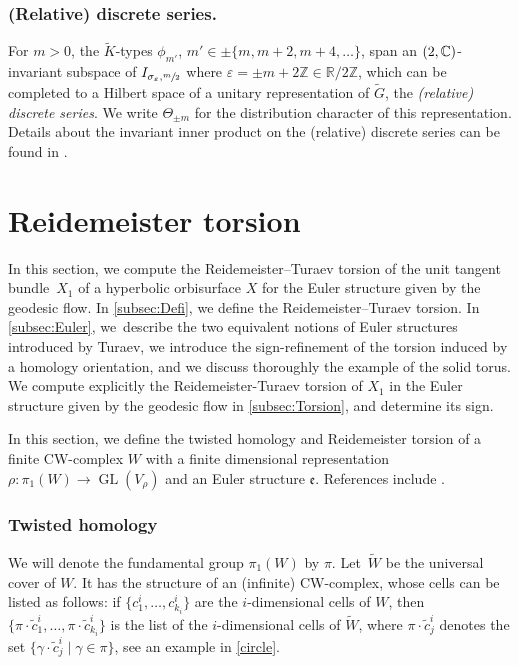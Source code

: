 \documentclass[JEP,XML,SOM,Unicode,NoFloatCountersInSection,published]{cedram}
\theoremstyle{plain}
\theoremstyle{definition}
\theoremstyle{remark}
\newcommand{\R}{\mathbb{R}}
\newcommand{\Z}{\mathbb{Z}}
\newcommand{\C}{\mathbb{C}}
\let\sl\relax
\DeclareMathOperator{\sl}{\mathfrak{sl}}
\DeclareMathOperator{\GL}{GL}
\numberwithin{equation}{section}
\begin{document}
\subsubsection*{(Relative) discrete series.} For $m>0$, the $\widetilde{K}$-types $\phi_{m'}$, $m'\in\pm\{m,m+2,m+4,\ldots\}$, span an $\sl(2,\C)$-invariant subspace of $I_{\sigma_\varepsilon,\sfrac{m}{2}}$ where $\varepsilon=\pm m+2\Z\in\R/2\Z$, which can be completed to a Hilbert space of a unitary representation of $\widetilde{G}$, the \emph{(relative) discrete series}. We write $\Theta_{\pm m}$ for the distribution character of this representation. Details about the invariant inner product on the (relative) discrete series can be found in \cite[\S 1]{Hof94}.

\section{Reidemeister torsion}
\label{sec:Reidemeister}
In this section, we compute the Reidemeister--Turaev torsion of the unit tangent bundle~$X_1$ of a hyperbolic orbisurface $X$ for the Euler structure given by the geodesic flow. In \cref{subsec:Defi}, we define the Reidemeister--Turaev torsion. In \cref{subsec:Euler}, we~describe the two equivalent notions of Euler structures introduced by Turaev, we introduce the sign-refinement of the torsion induced by a homology orientation, and we discuss thoroughly the example of the solid torus. We compute explicitly the Reidemeister-Turaev torsion of $X_1$ in the Euler structure given by the geodesic flow in \cref{subsec:Torsion}, and determine its sign.

\label{subsec:Defi}
In this section, we define the twisted homology and Reidemeister torsion of a finite CW-complex $W$ with a finite dimensional representation $\rho \colon \pi_1(W) \to \GL(V_\rho)$ and an Euler structure $\mathfrak e$. References include \cite{Nicolaescu,Turaev,Turaev_book}.

\subsubsection{Twisted homology}

We will denote the fundamental group $\pi_1(W)$ by $\pi$. Let~$\widetilde W$ be the universal cover of $W$. It has the structure of an (infinite) CW-complex, whose cells can be listed as follows:
if $\{c^i_1, \ldots, c^i_{k_i}\}$ are the $i$-dimensional cells of $W$, then $\{\pi\cdot \widetilde c^i_1, \ldots,\pi \cdot \widetilde c^i_{k_i}\}$ is the list of the $i$-dimensional cells of $\widetilde W$, where $\pi \cdot \widetilde c^i_j$ denotes the set $\{\gamma \cdot \widetilde c^i_j \mid \gamma \in \pi\}$, see an example in \cref{circle}.
\end{document}
